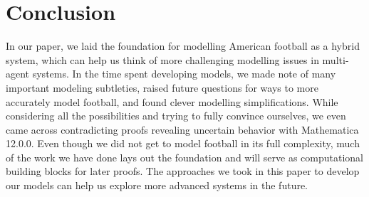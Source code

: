 
\section{Conclusion}

\quad In our paper, we laid the foundation for modelling American football as a hybrid system, which can help us think of more challenging modelling issues in multi-agent systems. In the time spent developing models, we made note of many important modeling subtleties, raised future questions for ways to more accurately model football, and found clever modelling simplifications. While considering all the possibilities and trying to fully convince ourselves, we even came across contradicting proofs revealing uncertain behavior with Mathematica 12.0.0. Even though we did not get to model football in its full complexity, much of the work we have done lays out the foundation and will serve as computational building blocks for later proofs. The approaches we took in this paper to develop our models can help us explore more advanced systems in the future.

